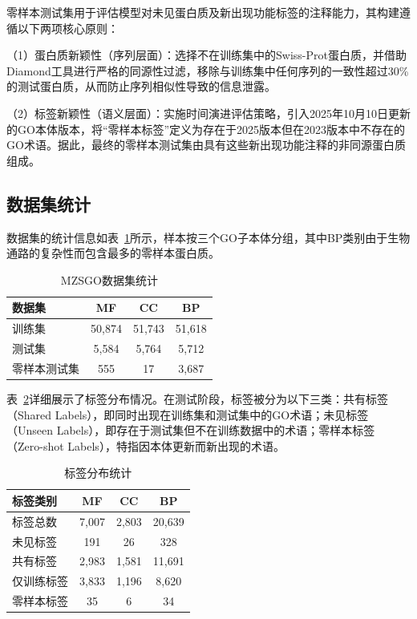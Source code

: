 零样本测试集用于评估模型对未见蛋白质及新出现功能标签的注释能力，其构建遵循以下两项核心原则：

（1）蛋白质新颖性（序列层面）：选择不在训练集中的Swiss-Prot蛋白质，并借助Diamond工具进行严格的同源性过滤，移除与训练集中任何序列的一致性超过30\%的测试蛋白质，从而防止序列相似性导致的信息泄露。

（2）标签新颖性（语义层面）：实施时间演进评估策略，引入2025年10月10日更新的GO本体版本，将“零样本标签”定义为存在于2025版本但在2023版本中不存在的GO术语。据此，最终的零样本测试集由具有这些新出现功能注释的非同源蛋白质组成。

\subsection{数据集统计}

数据集的统计信息如表~\ref{tab:mzsgo_dataset_stats}所示，样本按三个GO子本体分组，其中BP类别由于生物通路的复杂性而包含最多的零样本蛋白质。

\begin{table}[h]
\centering
\caption{MZSGO数据集统计}
\label{tab:mzsgo_dataset_stats}
\small
\begin{tabular}{lccc}
\toprule
数据集 & MF & CC & BP \\
\midrule
训练集 & 50,874 & 51,743 & 51,618 \\
测试集 & 5,584 & 5,764 & 5,712 \\
零样本测试集 & 555 & 17 & 3,687 \\
\bottomrule
\end{tabular}
\end{table}

表~\ref{tab:mzsgo_label_stats}详细展示了标签分布情况。在测试阶段，标签被分为以下三类：共有标签（Shared Labels），即同时出现在训练集和测试集中的GO术语；未见标签（Unseen Labels），即存在于测试集但不在训练数据中的术语；零样本标签（Zero-shot Labels），特指因本体更新而新出现的术语。

\begin{table}[h]
\centering
\caption{标签分布统计}
\label{tab:mzsgo_label_stats}
\small
\begin{tabular}{lccc}
\toprule
标签类别 & MF & CC & BP \\
\midrule
标签总数 & 7,007 & 2,803 & 20,639 \\
未见标签 & 191 & 26 & 328 \\
共有标签 & 2,983 & 1,581 & 11,691 \\
仅训练标签 & 3,833 & 1,196 & 8,620 \\
零样本标签 & 35 & 6 & 34 \\
\bottomrule
\end{tabular}
\end{table}

